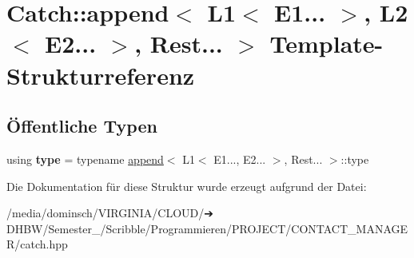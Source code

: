 \hypertarget{structCatch_1_1append_3_01L1_3_01E1_8_8_8_01_4_00_01L2_3_01E2_8_8_8_01_4_00_01Rest_8_8_8_01_4}{}\section{Catch\+:\+:append$<$ L1$<$ E1... $>$, L2$<$ E2... $>$, Rest... $>$ Template-\/\+Strukturreferenz}
\label{structCatch_1_1append_3_01L1_3_01E1_8_8_8_01_4_00_01L2_3_01E2_8_8_8_01_4_00_01Rest_8_8_8_01_4}
\subsection*{Öffentliche Typen}
\begin{DoxyCompactItemize}
\item 
\mbox{\label{structCatch_1_1append_3_01L1_3_01E1_8_8_8_01_4_00_01L2_3_01E2_8_8_8_01_4_00_01Rest_8_8_8_01_4_ab3448b6c1403a945f939d6ae6c5b39f2}} 
using {\bfseries type} = typename \hyperlink{structCatch_1_1append}{append}$<$ L1$<$ E1..., E2... $>$, Rest... $>$\+::type
\end{DoxyCompactItemize}


Die Dokumentation für diese Struktur wurde erzeugt aufgrund der Datei\+:\begin{DoxyCompactItemize}
\item 
/media/dominsch/\+V\+I\+R\+G\+I\+N\+I\+A/\+C\+L\+O\+U\+D/➔ D\+H\+B\+W/\+Semester\+\_/\+Scribble/\+Programmieren/\+P\+R\+O\+J\+E\+C\+T/\+C\+O\+N\+T\+A\+C\+T\+\_\+\+M\+A\+N\+A\+G\+E\+R/catch.\+hpp\end{DoxyCompactItemize}
